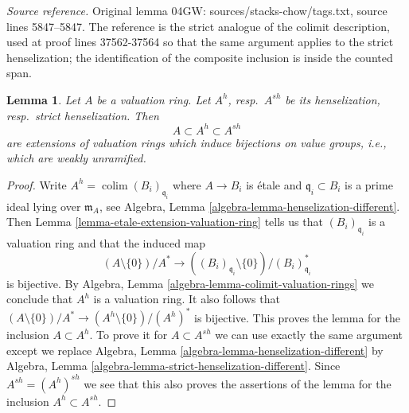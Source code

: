 \documentclass[10pt,a4paper]{amsart}
\theoremstyle{plain}
\newtheorem{lemma}[subsection]{Lemma}
\theoremstyle{definition}
\theoremstyle{remark}
\numberwithin{equation}{subsection}
\def\colim{\mathop{\mathrm{colim}}\nolimits}
\begin{document}
\noindent\textit{Source reference.} Original lemma 04GW: sources/stacks-chow/tags.txt, source lines 5847--5847. The reference is the strict analogue of the colimit description, used at proof lines 37562-37564 so that the same argument applies to the strict henselization; the identification of the composite inclusion is inside the counted span.\par\medskip
\begin{lemma}
\label{lemma-henselization-valuation-ring}
Let $A$ be a valuation ring. Let $A^h$, resp.\ $A^{sh}$ be its
henselization, resp.\ strict henselization. Then
$$
A \subset A^h \subset A^{sh}
$$
are extensions of valuation rings which induce bijections on
value groups, i.e., which are weakly unramified.
\end{lemma}

\begin{proof}
Write $A^h = \colim (B_i)_{\mathfrak q_i}$ where $A \to B_i$
is \'etale and $\mathfrak q_i \subset B_i$ is a prime ideal
lying over $\mathfrak m_A$, see
Algebra, Lemma \ref{algebra-lemma-henselization-different}.
Then Lemma \ref{lemma-etale-extension-valuation-ring}
tells us that $(B_i)_{\mathfrak q_i}$
is a valuation ring and that the induced map
$$
(A \setminus \{0\})/A^* \longrightarrow
((B_i)_{\mathfrak q_i} \setminus \{0\}) / (B_i)_{\mathfrak q_i}^*
$$
is bijective. By Algebra, Lemma \ref{algebra-lemma-colimit-valuation-rings}
we conclude that $A^h$ is a valuation ring. It also follows that
$(A \setminus \{0\})/A^* \to (A^h \setminus \{0\})/(A^h)^*$
is bijective. This proves the lemma for the inclusion $A \subset A^h$.
To prove it for $A \subset A^{sh}$ we can use exactly the same argument
except we replace Algebra, Lemma \ref{algebra-lemma-henselization-different} by
Algebra, Lemma \ref{algebra-lemma-strict-henselization-different}.
Since $A^{sh} = (A^h)^{sh}$ we see that this also proves the
assertions of the lemma for the inclusion $A^h \subset A^{sh}$.
\end{proof}
\end{document}
